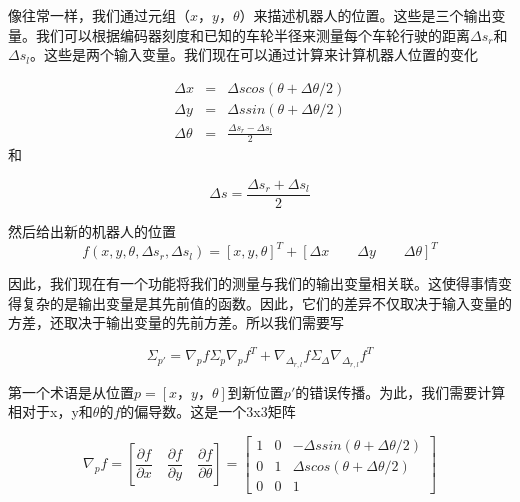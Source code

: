 像往常一样，我们通过元组$（x，y，\theta）$来描述机器人的位置。这些是三个输出变量。我们可以根据编码器刻度和已知的车轮半径来测量每个车轮行驶的距离$\Delta s_r$和$\Delta s_l$。这些是两个输入变量。我们现在可以通过计算来计算机器人位置的变化

\begin{eqnarray}
\Delta x  &=& \Delta s cos(\theta+\Delta \theta /2)\\
\Delta y  &=& \Delta s sin(\theta+\Delta \theta/2)\\
\Delta \theta &=& \frac{\Delta s_r-\Delta s_l}{2}
\end{eqnarray}
和

\begin{equation}
\Delta s=\frac{\Delta s_r + \Delta s_l}{2}
\end{equation}


然后给出新的机器人的位置
\begin{equation}
f(x,y,\theta,\Delta s_r, \Delta s_l)=[x,y,\theta]^T + [\Delta x \qquad \Delta y \qquad \Delta \theta]^T
\end{equation}



因此，我们现在有一个功能将我们的测量与我们的输出变量相关联。这使得事情变得复杂的是输出变量是其先前值的函数。因此，它们的差异不仅取决于输入变量的方差，还取决于输出变量的先前方差。所以我们需要写

\begin{equation}\label{eq:errorpropodom}
\Sigma_{p'}=\nabla_p f \Sigma_p \nabla_p f^T + \nabla_{\Delta_{r,l}}f \Sigma_{\Delta}\nabla_{\Delta_{r,l}}f^T
\end{equation}


第一个术语是从位置$p=[x，y，θ]$到新位置$p'$的错误传播。为此，我们需要计算相对于x，y和$\theta$的$f$的偏导数。这是一个3x3矩阵

\begin{equation}
\nabla_p f=\left[\frac{\partial f}{\partial x} \quad \frac{\partial f}{\partial y} \quad \frac{\partial f}{\partial \theta}\right]=\left[\begin{array}{ccc}1 & 0 & -\Delta s sin(\theta +\Delta \theta /2)\\0 & 1 & \Delta s cos(\theta + \Delta \theta/2)\\0 & 0 &1\end{array}\right]
\end{equation}

